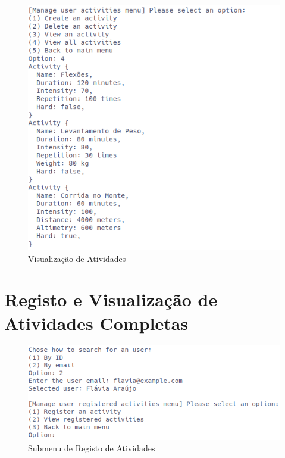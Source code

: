 \documentclass[a4paper,12pt]{scrreprt}
\begin{document}
    \begin{figure}[!ht]
        \centering
        \includegraphics[width=\textwidth]{images/viewActivities.png}
        \caption{Visualização de Atividades}
        \label{fig:view-activities}
    \end{figure}

\clearpage
\section{Registo e Visualização de Atividades Completas}
    \label{sec:registo-atividades}

    \begin{figure}[!ht]
        \centering
        \includegraphics[width=\textwidth]{images/registerActivitySubMenu.png}
        \caption{Submenu de Registo de Atividades}
        \label{fig:submenu-register-activity}
    \end{figure}
\end{document}
